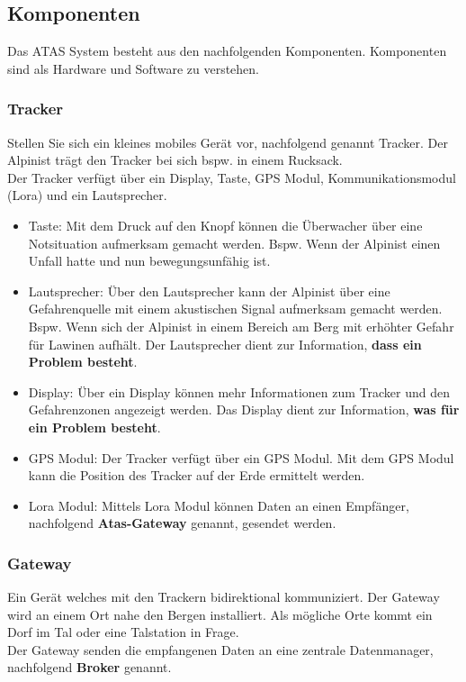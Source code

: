 \documentclass[11pt,english,german]{report}
\theoremstyle{definition}
\begin{document}
\subsection{Komponenten}
Das ATAS System besteht aus den nachfolgenden Komponenten. Komponenten sind als Hardware und Software zu verstehen.
\subsubsection{Tracker}
Stellen Sie sich ein kleines mobiles Gerät vor, nachfolgend genannt Tracker. Der Alpinist trägt den Tracker bei sich bspw. in einem Rucksack.\bigskip \\ 
Der Tracker verfügt über ein Display, Taste, GPS Modul, Kommunikationsmodul (Lora) und ein Lautsprecher.
\begin{itemize}
\item
Taste: Mit dem Druck auf den Knopf können die Überwacher über eine Notsituation aufmerksam gemacht werden. Bspw. Wenn der Alpinist einen Unfall hatte und nun bewegungsunfähig ist.
\item
Lautsprecher: Über den Lautsprecher kann der Alpinist über eine Gefahrenquelle mit einem akustischen Signal aufmerksam gemacht werden. Bspw. Wenn sich der Alpinist in einem Bereich am Berg mit erhöhter Gefahr für Lawinen aufhält. Der Lautsprecher dient zur Information, \textbf{dass ein Problem besteht}.
\item
Display: Über ein Display können mehr Informationen zum Tracker und den Gefahrenzonen angezeigt werden. Das Display dient zur Information, \textbf{was für ein Problem besteht}.
\item
GPS Modul: Der Tracker verfügt über ein GPS Modul. Mit dem GPS Modul kann die Position des Tracker auf der Erde ermittelt werden.
\item 
Lora Modul: Mittels Lora Modul können Daten an einen Empfänger, nachfolgend \textbf{Atas-Gateway} genannt, gesendet werden.
\end{itemize}

\subsubsection{Gateway}
Ein Gerät welches mit den Trackern bidirektional kommuniziert. Der Gateway wird an einem Ort nahe den Bergen installiert. Als mögliche Orte kommt ein Dorf im Tal oder eine Talstation in Frage.\bigskip \\
Der Gateway senden die empfangenen Daten an eine zentrale Datenmanager, nachfolgend \textbf{Broker} genannt.
\end{document}
